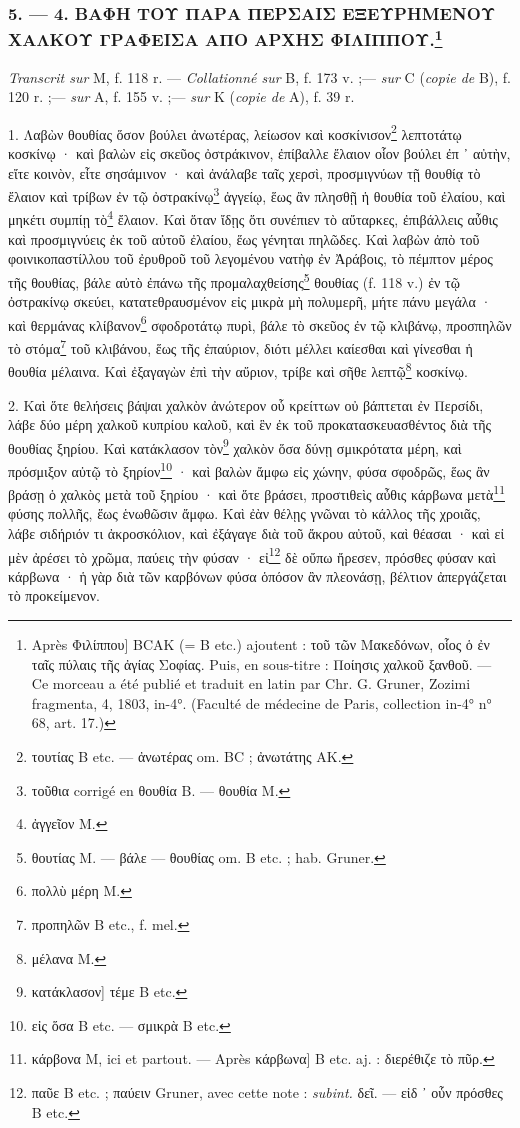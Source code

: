 \documentclass[a4paper, 11pt, oneside, polutonikogreek, french]{article}
\begin{document}
\bigskip
\centerline{\EightStarTaper}
\centerline{\EightStarTaper\EightStarTaper}
\bigskip

\subsubsection[5. --- 4. ΒΑΦΗ ΤΟΥ ΠΑΡΑ ΠΕΡΣΑΙΣ ΕΞΕΥΡΗΜΕΝΟΥ ΧΑΛΚΟΥ ΓΡΑΦΕΙΣΑ ΑΠΟ ΑΡΧΗΣ ΦΙΛΙΠΠΟΥ.]{5. --- 4. ΒΑΦΗ ΤΟΥ ΠΑΡΑ ΠΕΡΣΑΙΣ ΕΞΕΥΡΗΜΕΝΟΥ ΧΑΛΚΟΥ ΓΡΑΦΕΙΣΑ ΑΠΟ ΑΡΧΗΣ ΦΙΛΙΠΠΟΥ.\footnote{Après Φιλίππου] BCAK (= B etc.) ajoutent : τοῦ τῶν Μακεδόνων, οἷος ὁ ἐν ταῖς πύλαις τῆς ἀγίας Σοφίας. Puis, en sous-titre : Ποίησις χαλκοῦ ξανθοῦ. --- Ce morceau a été publié et traduit en latin par Chr. G. Gruner, Zozimi fragmenta, 4, 1803, in-4°. (Faculté de médecine de Paris, collection in-4° n° 68, art. 17.)}}

\emph{Transcrit sur} M, f. 118 r. --- \emph{Collationné sur} B, f. 173 v. ;--- \emph{sur} C (\emph{copie de} B), f. 120 r. ;--- \emph{sur} A, f. 155 v. ;--- \emph{sur} K (\emph{copie de} A), f. 39 r.

1. Λαβὼν θουθίας ὅσον βούλει ἀνωτέρας, λείωσον καὶ κοσκίνισον\footnote{τουτίας B etc. --- ἀνωτέρας om. BC ; ἀνωτάτης AK.} λεπτοτάτῳ κοσκίνῳ · καὶ βαλὼν εἰς σκεῦος ὀστράκινον, ἐπίβαλλε ἔλαιον οἷον βούλει ἐπ ᾽ αὐτὴν, εἴτε κοινὸν, εἶτε σησάμινον · καὶ ἀνάλαβε ταῖς χερσὶ, προσμιγνύων τῇ θουθίᾳ τὸ ἔλαιον καὶ τρίβων ἐν τῷ ὀστρακίνῳ\footnote{τοῦθια corrigé en θουθία B. --- θουθία M.} ἀγγείῳ, ἕως ἂν πλησθῇ ἡ θουθία τοῦ ἐλαίου, καὶ μηκέτι συμπίῃ τὸ\footnote{ἀγγεῖον M.} ἔλαιον. Καὶ ὅταν ἴδῃς ὅτι συνέπιεν τὸ αὔταρκες, ἐπιβάλλεις αὖθις καὶ προσμιγνύεις ἐκ τοῦ αὐτοῦ ἐλαίου, ἕως γένηται πηλῶδες. Καὶ λαβὼν ἀπὸ τοῦ φοινικοπαστίλλου τοῦ ἐρυθροῦ τοῦ λεγομένου νατὴφ ἐν Ἀράβοις, τὸ πέμπτον μέρος τῆς θουθίας, βάλε αὐτὸ ἐπάνω τῆς προμαλαχθείσης\footnote{θουτίας M. --- βάλε --- θουθίας om. B etc. ; hab. Gruner.} θουθίας (f. 118 v.) ἐν τῷ ὀστρακίνῳ σκεύει, κατατεθραυσμένον εἰς μικρὰ μὴ πολυμερῆ, μήτε πάνυ μεγάλα · καὶ θερμάνας κλίβανον\footnote{πολλὺ μέρη M.} σφοδροτάτῳ πυρὶ, βάλε τὸ σκεῦος ἐν τῷ κλιβάνῳ, προσπηλῶν τὸ στόμα\footnote{προπηλῶν B etc., f. mel.} τοῦ κλιβάνου, ἕως τῆς ἐπαύριον, διότι μέλλει καίεσθαι καὶ γίνεσθαι ἡ θουθία μέλαινα. Καὶ ἐξαγαγὼν ἐπὶ τὴν αὔριον, τρίβε καὶ σῆθε λεπτῷ\footnote{μέλανα M.} κοσκίνῳ.

2. Καὶ ὅτε θελήσεις βάψαι χαλκὸν ἀνώτερον οὗ κρείττων οὐ βάπτεται ἐν Περσίδι, λάβε δύο μέρη χαλκοῦ κυπρίου καλοῦ, καὶ ἓν ἐκ τοῦ προκατασκευασθέντος διὰ τῆς θουθίας ξηρίου. Καὶ κατάκλασον τὸν\footnote{κατάκλασον] τέμε B etc.} χαλκὸν ὅσα δύνῃ σμικρότατα μέρη, καὶ πρόσμιξον αὐτῷ τὸ ξηρίον\footnote{εἰς ὅσα B etc. --- σμικρὰ B etc.} · καὶ βαλὼν ἄμφω εἰς χώνην, φύσα σφοδρῶς, ἕως ἂν βράσῃ ὁ χαλκὸς μετὰ τοῦ ξηρίου · καὶ ὅτε βράσει, προστιθεὶς αὖθις κάρβωνα μετὰ\footnote{κάρβονα M, ici et partout. --- Après κάρβωνα] B etc. aj. : διερέθιζε τὸ πῦρ.} φύσης πολλῆς, ἕως ἑνωθῶσιν ἄμφω. Καὶ ἐὰν θέλῃς γνῶναι τὸ κάλλος τῆς χροιᾶς, λάβε σιδήριόν τι ἀκροσκόλιον, καὶ ἐξάγαγε διὰ τοῦ ἄκρου αὐτοῦ, καὶ θέασαι · καὶ εἰ μὲν ἀρέσει τὸ χρῶμα, παύεις τὴν φύσαν · εἰ\footnote{παῦε B etc. ; παύειν Gruner, avec cette note : \emph{subint.} δεῖ. --- εἰδ ᾽ οὗν πρόσθες B etc.} δὲ οὔπω ἤρεσεν, πρόσθες φύσαν καὶ κάρβωνα · ἡ γὰρ διὰ τῶν καρβόνων φύσα ὁπόσον ἂν πλεονάσῃ, βέλτιον ἀπεργάζεται τὸ προκείμενον.
\end{document}
